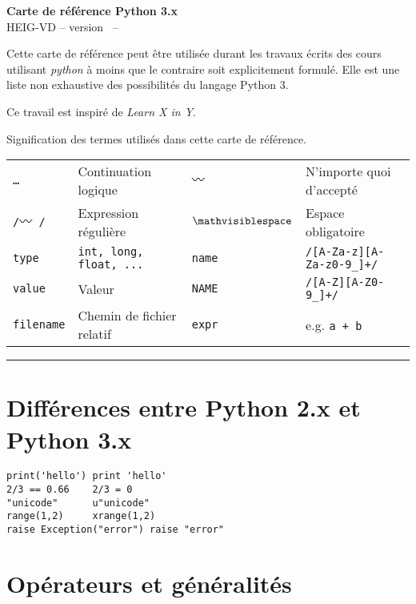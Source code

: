\documentclass{article}
\newcommand{\etc}{\small \ldots}
\newcommand{\any}{$\hzigzag$~}
\newcommand{\spc}{$\mathvisiblespace$}
\newcommand{\cd}{\lstinline}
\begin{document}
\begin{multicols*}{3}

\begin{center}
  {\Large \bf Carte de référence Python 3.x} \\
  HEIG-VD -- version \revision \ -- \revisiondate \\
\end{center}

Cette carte de référence peut être utilisée durant les travaux écrits
des cours utilisant \emph{python} à moins que le contraire soit explicitement formulé.
Elle est une liste non exhaustive des possibilités du langage Python 3.

Ce travail est inspiré de \emph{Learn X in Y}.

Signification des termes utilisés dans cette carte de référence.

\begin{tabularx}{\linewidth}{
  >{\hsize=0.5\hsize}X%
  >{\hsize=1.5\hsize}X%
  >{\hsize=0.5\hsize}X%
  >{\hsize=1.5\hsize}X%
  }

  \tt \etc      & Continuation logique    & \tt \any    & N'importe quoi d'accepté \\
  \tt /\any/    & Expression régulière    & \tt \spc    & Espace obligatoire \\
  \cd{type}     & \tt int, long, float, ... & \cd{name} & \tt /[A-Za-z][A-Za-z0-9\_]+/ \\
  \cd{value}    & Valeur & \cd{NAME} & \tt /[A-Z][A-Z0-9\_]+/ \\
  \cd{filename} & Chemin de fichier relatif & \cd{expr}   & e.g. \tt a + b \\
\end{tabularx}
\hrule

\section*{Différences entre Python 2.x et Python 3.x}

\begin{lstlisting}
print('hello') print 'hello'
2/3 == 0.66    2/3 = 0
"unicode"      u"unicode"
range(1,2)     xrange(1,2)
raise Exception("error") raise "error"
\end{lstlisting}

\section*{Opérateurs et généralités}


\end{multicols*}
\end{document}
